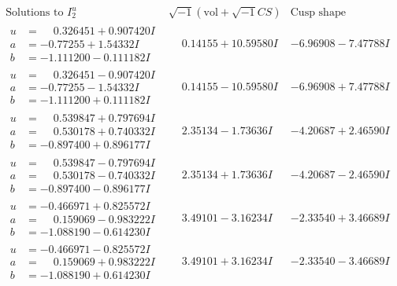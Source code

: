 \documentclass[1p]{elsarticle_modified}
\theoremstyle{definition}
\newcommand{\I}{\sqrt{-1}}
\begin{document}
$$\begin{array}{c|c|c}  
\text{Solutions to }I^u_{2}& \I (\text{vol} + \sqrt{-1}CS) & \text{Cusp shape}\\
 \hline 
\begin{aligned}
u &= \phantom{-}0.326451 + 0.907420 I \\
a &= -0.77255 + 1.54332 I \\
b &= -1.111200 - 0.111182 I\end{aligned}
 & \phantom{-}0.14155 + 10.59580 I & -6.96908 - 7.47788 I \\ \hline\begin{aligned}
u &= \phantom{-}0.326451 - 0.907420 I \\
a &= -0.77255 - 1.54332 I \\
b &= -1.111200 + 0.111182 I\end{aligned}
 & \phantom{-}0.14155 - 10.59580 I & -6.96908 + 7.47788 I \\ \hline\begin{aligned}
u &= \phantom{-}0.539847 + 0.797694 I \\
a &= \phantom{-}0.530178 + 0.740332 I \\
b &= -0.897400 + 0.896177 I\end{aligned}
 & \phantom{-}2.35134 - 1.73636 I & -4.20687 + 2.46590 I \\ \hline\begin{aligned}
u &= \phantom{-}0.539847 - 0.797694 I \\
a &= \phantom{-}0.530178 - 0.740332 I \\
b &= -0.897400 - 0.896177 I\end{aligned}
 & \phantom{-}2.35134 + 1.73636 I & -4.20687 - 2.46590 I \\ \hline\begin{aligned}
u &= -0.466971 + 0.825572 I \\
a &= \phantom{-}0.159069 - 0.983222 I \\
b &= -1.088190 - 0.614230 I\end{aligned}
 & \phantom{-}3.49101 - 3.16234 I & -2.33540 + 3.46689 I \\ \hline\begin{aligned}
u &= -0.466971 - 0.825572 I \\
a &= \phantom{-}0.159069 + 0.983222 I \\
b &= -1.088190 + 0.614230 I\end{aligned}
 & \phantom{-}3.49101 + 3.16234 I & -2.33540 - 3.46689 I \\ \hline\begin{aligned}

\end{aligned}
\end{array}$$
\end{document}
